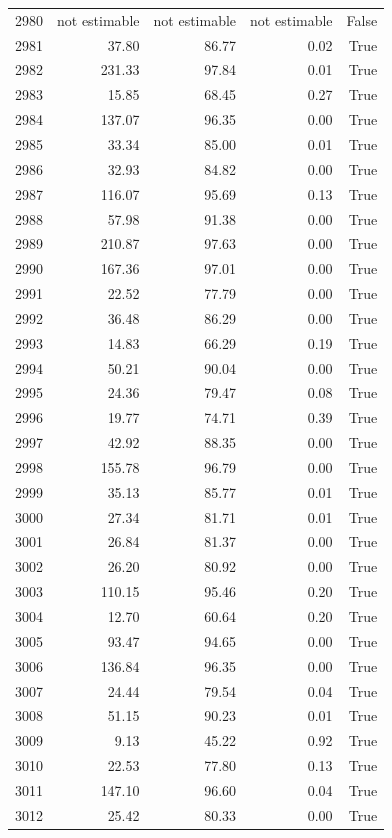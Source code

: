 \begin{longtable}{rrrrr}
2980 & not estimable & not estimable & not estimable & False \\
2981 & 37.80 & 86.77 & 0.02 & True \\
2982 & 231.33 & 97.84 & 0.01 & True \\
2983 & 15.85 & 68.45 & 0.27 & True \\
2984 & 137.07 & 96.35 & 0.00 & True \\
2985 & 33.34 & 85.00 & 0.01 & True \\
2986 & 32.93 & 84.82 & 0.00 & True \\
2987 & 116.07 & 95.69 & 0.13 & True \\
2988 & 57.98 & 91.38 & 0.00 & True \\
2989 & 210.87 & 97.63 & 0.00 & True \\
2990 & 167.36 & 97.01 & 0.00 & True \\
2991 & 22.52 & 77.79 & 0.00 & True \\
2992 & 36.48 & 86.29 & 0.00 & True \\
2993 & 14.83 & 66.29 & 0.19 & True \\
2994 & 50.21 & 90.04 & 0.00 & True \\
2995 & 24.36 & 79.47 & 0.08 & True \\
2996 & 19.77 & 74.71 & 0.39 & True \\
2997 & 42.92 & 88.35 & 0.00 & True \\
2998 & 155.78 & 96.79 & 0.00 & True \\
2999 & 35.13 & 85.77 & 0.01 & True \\
3000 & 27.34 & 81.71 & 0.01 & True \\
3001 & 26.84 & 81.37 & 0.00 & True \\
3002 & 26.20 & 80.92 & 0.00 & True \\
3003 & 110.15 & 95.46 & 0.20 & True \\
3004 & 12.70 & 60.64 & 0.20 & True \\
3005 & 93.47 & 94.65 & 0.00 & True \\
3006 & 136.84 & 96.35 & 0.00 & True \\
3007 & 24.44 & 79.54 & 0.04 & True \\
3008 & 51.15 & 90.23 & 0.01 & True \\
3009 & 9.13 & 45.22 & 0.92 & True \\
3010 & 22.53 & 77.80 & 0.13 & True \\
3011 & 147.10 & 96.60 & 0.04 & True \\
3012 & 25.42 & 80.33 & 0.00 & True \\

\end{longtable}
